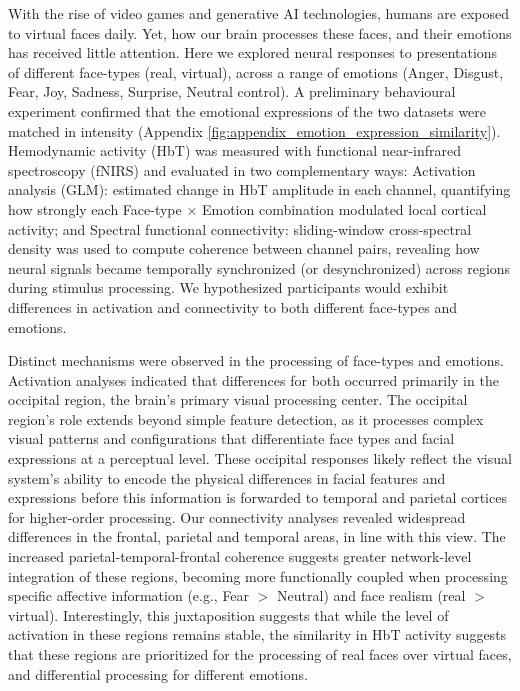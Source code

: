 With the rise of video games and generative AI technologies, humans are exposed to virtual faces daily. 
Yet, how our brain processes these faces, and their emotions has received little attention. 
Here we explored neural responses to presentations of different face-types (real, virtual), across a range of emotions (Anger, Disgust, Fear, Joy, Sadness, Surprise, Neutral control). 
A preliminary behavioural experiment confirmed that the emotional expressions of the two datasets were matched in intensity (Appendix \ref{fig:appendix_emotion_expression_similarity}).
Hemodynamic activity (HbT) was measured with functional near-infrared spectroscopy (fNIRS) and evaluated in two complementary ways: Activation analysis (GLM): estimated change in HbT amplitude in each channel, quantifying how strongly each Face-type \texorpdfstring{$\times$}{x} Emotion combination modulated local cortical activity; and Spectral functional connectivity: sliding-window cross-spectral density was used to compute coherence between channel pairs, revealing how neural signals became temporally synchronized (or desynchronized) across regions during stimulus processing. 
We hypothesized participants would exhibit differences in activation and connectivity to both different face-types and emotions. 

Distinct mechanisms were observed in the processing of face-types and emotions. 
Activation analyses indicated that differences for both occurred primarily in the occipital region, the brain's primary visual processing center. 
The occipital region's role extends beyond simple feature detection, as it processes complex visual patterns and configurations that differentiate face types and facial expressions at a perceptual level. 
These occipital responses likely reflect the visual system's ability to encode the physical differences in facial features and expressions before this information is forwarded to temporal and parietal cortices for higher-order processing. 
Our connectivity analyses revealed widespread differences in the frontal, parietal and temporal areas, in line with this view. 
The increased parietal-temporal-frontal coherence suggests greater network-level integration of these regions, becoming more functionally coupled when processing specific affective information (e.g., Fear $>$ Neutral) and face realism (real $>$ virtual).
Interestingly, this juxtaposition suggests that while the level of activation in these regions remains stable, the similarity in HbT activity suggests that these regions are prioritized for the processing of real faces over virtual faces, and differential processing for different emotions.


